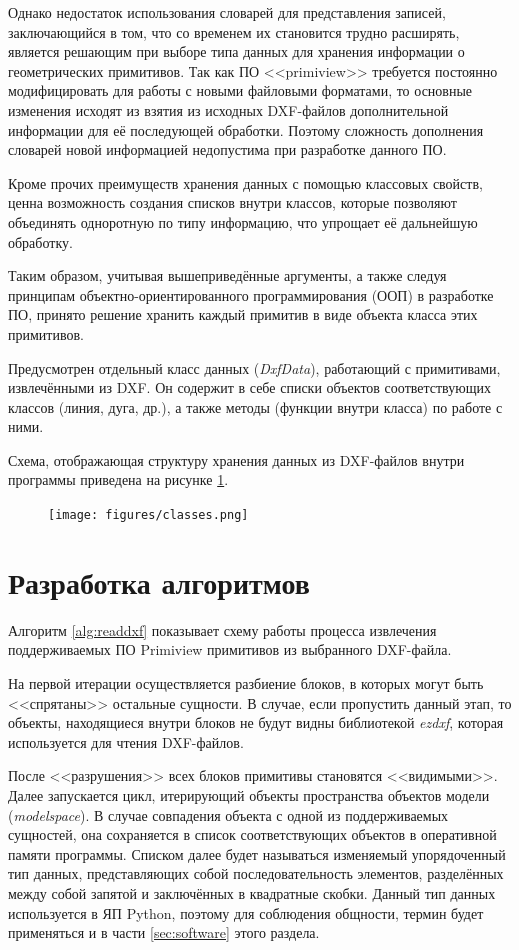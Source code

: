 Однако недостаток использования словарей для представления записей, заключающийся в том, что со временем их становится трудно расширять, является решающим при выборе типа данных для хранения информации о геометрических примитивов. Так как ПО <<primiview>> требуется постоянно модифицировать для работы с новыми файловыми форматами, то основные изменения исходят из взятия из исходных DXF-файлов дополнительной информации для её последующей обработки. Поэтому сложность дополнения словарей новой информацией недопустима при разработке данного ПО.

Кроме прочих преимуществ хранения данных с помощью классовых свойств, ценна возможность создания списков внутри классов, которые позволяют объединять одноротную по типу информацию, что упрощает её дальнейшую обработку.

Таким образом, учитывая вышеприведённые аргументы, а также следуя принципам объектно-ориентированного программирования (ООП) в разработке ПО, принято решение хранить каждый примитив в виде объекта класса этих примитивов.

Предусмотрен отдельный класс данных (\textit{DxfData}), работающий с примитивами, извлечёнными из DXF. Он содержит в себе списки объектов соответствующих классов (линия, дуга, др.), а также методы (функции внутри класса) по работе с ними.

Схема, отображающая структуру хранения данных из DXF-файлов внутри программы приведена на рисунке \ref{fig:classes}.

\begin{figure}[H]
	\centering
	\texttt{[image: figures/classes.png]}
	\label{fig:classes}
\end{figure}


\section{Разработка алгоритмов} \label{sec:algs}
Алгоритм \ref{alg:readdxf} показывает схему работы процесса извлечения поддерживаемых ПО Primiview примитивов из выбранного DXF-файла.

На первой итерации осуществляется разбиение блоков, в которых могут быть <<спрятаны>> остальные сущности. В случае, если пропустить данный этап, то объекты, находящиеся внутри блоков не будут видны библиотекой \textit{ezdxf}, которая используется для чтения DXF-файлов.

После <<разрушения>> всех блоков примитивы становятся <<видимыми>>. Далее запускается цикл, итерирующий объекты пространства объектов модели (\textit{modelspace}). В случае совпадения объекта с одной из поддерживаемых сущностей, она сохраняется в список соответствующих объектов в оперативной памяти программы. Списком далее будет называться изменяемый упорядоченный тип данных, представляющих собой последовательность элементов, разделённых между собой запятой и заключённых в квадратные скобки. Данный тип данных используется в ЯП Python, поэтому для соблюдения общности, термин будет применяться и в части \ref{sec:software} этого раздела.

